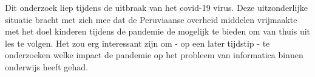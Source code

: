 Dit onderzoek liep tijdens de uitbraak van het covid-19 virus. Deze uitzonderlijke situatie bracht met zich mee dat de Peruviaanse overheid middelen vrijmaakte met het doel kinderen tijdens de pandemie de mogelijk te bieden om van thuis uit les te volgen.  Het zou erg interessant zijn om - op een later tijdstip - te onderzoeken welke impact de pandemie op het probleem van informatica binnen onderwijs heeft gehad.


